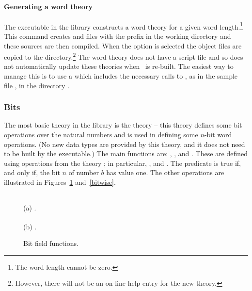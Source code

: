 {\paragraph{Generating a word theory}

The executable  in the  library constructs a
word theory for a given word length.\footnote{The word length cannot
  be zero.}  This command creates  and 
files with the prefix  in the working
directory and these sources are then compiled. When the 
option is selected the object files are copied to the 
directory.\footnote{However, there will not be an on-line help entry
  for the new theory.}  The word theory does not have a script file
and so  does not automatically update these theories \eg{}
when \HOL\ is re-built.  The easiest way to manage this is to use a
 which includes the necessary calls to
, as in the sample file , in
the directory .


\subsubsection{Bits}
\label{bits}

The most basic theory in the library is the theory  -- this
theory defines some bit operations over the natural numbers and is
used in defining some $n$-bit word operations.  (No new data types are
provided by this theory, and it does not need to be built by the
 executable.)  The main functions are: ,
,  and .  These are defined
using operations from the theory ; in
particular, ,  and .  The
predicate  is true if, and only if, the bit $n$ of
number $b$ has value one.  The other operations are illustrated in
Figures~\ref{bits-slice} and~\ref{bitwise}.
%
%
%
%

\begin{figure}
\begin{center}
 \\[3mm]
(a) . \\[6mm]
 \\[3mm]
(b) .
\end{center}
\caption{Bit field functions.\label{bits-slice}}
\end{figure}

}
